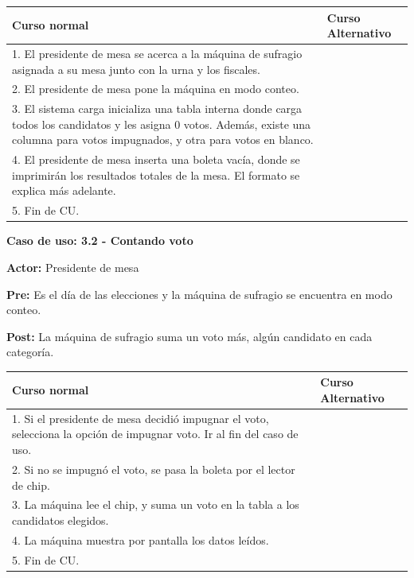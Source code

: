 \begin{table}[h!]
	
 \begin{tabular}{|p{7.5cm} | p{7.5cm}|} 
 \hline
 \textbf{Curso normal} & \textbf{Curso Alternativo} \\
 \hline


1. El presidente de mesa se acerca a la máquina de sufragio asignada a su mesa junto con la urna y los fiscales. & \\
\hline

2. El presidente de mesa pone la máquina en modo conteo. & \\
\hline

3. El sistema carga inicializa una tabla interna donde carga todos los candidatos y les asigna 0 votos. Además, existe una columna para votos impugnados, y otra para votos en blanco. & \\
\hline

4. El presidente de mesa inserta una boleta vacía, donde se imprimirán los resultados totales de la mesa. El formato se explica más adelante. & \\
\hline

5. Fin de CU. & \\
\hline

\end{tabular}
\end{table}


\textbf{Caso de uso: 3.2 - Contando voto}

\textbf{Actor:} Presidente de mesa

\textbf{Pre:} Es el día de las elecciones y la máquina de sufragio se encuentra en modo conteo.

\textbf{Post:} La máquina de sufragio suma un voto más, algún candidato en cada categoría.

\newpage

\begin{table}[h!]
	
 \begin{tabular}{|p{7.5cm} | p{7.5cm}|} 
 \hline
 \textbf{Curso normal} & \textbf{Curso Alternativo} \\
 \hline


1. Si el presidente de mesa decidió impugnar el voto, selecciona la opción de impugnar voto. Ir al fin del caso de uso. & \\

\hline

2. Si no se impugnó el voto, se pasa la boleta por el lector de chip. & \\

\hline


3. La máquina lee el chip, y suma un voto en la tabla a los candidatos elegidos. & \\

\hline

4. La máquina muestra por pantalla los datos leídos. & \\

\hline

5. Fin de CU. & \\
\hline
\end{tabular}
\end{table}



